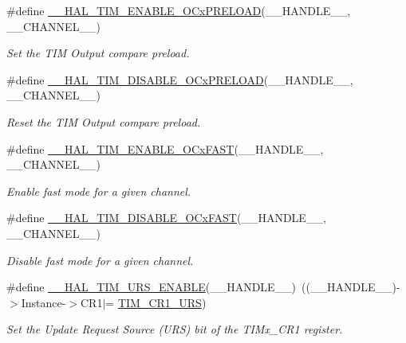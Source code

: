 \begin{DoxyCompactItemize}
\#define \hyperlink{group___t_i_m___exported___macros_ga199e848f0a301987a500faea0db2dd70}{\+\_\+\+\_\+\+H\+A\+L\+\_\+\+T\+I\+M\+\_\+\+E\+N\+A\+B\+L\+E\+\_\+\+O\+Cx\+P\+R\+E\+L\+O\+AD}(\+\_\+\+\_\+\+H\+A\+N\+D\+L\+E\+\_\+\+\_\+,  \+\_\+\+\_\+\+C\+H\+A\+N\+N\+E\+L\+\_\+\+\_\+)
\begin{DoxyCompactList}\small\item\em Set the T\+IM Output compare preload. \end{DoxyCompactList}\item 
\#define \hyperlink{group___t_i_m___exported___macros_ga3e0ec4eb797b54c408a3be067f41a2f8}{\+\_\+\+\_\+\+H\+A\+L\+\_\+\+T\+I\+M\+\_\+\+D\+I\+S\+A\+B\+L\+E\+\_\+\+O\+Cx\+P\+R\+E\+L\+O\+AD}(\+\_\+\+\_\+\+H\+A\+N\+D\+L\+E\+\_\+\+\_\+,  \+\_\+\+\_\+\+C\+H\+A\+N\+N\+E\+L\+\_\+\+\_\+)
\begin{DoxyCompactList}\small\item\em Reset the T\+IM Output compare preload. \end{DoxyCompactList}\item 
\#define \hyperlink{group___t_i_m___exported___macros_ga390795eb198214e5d4ed235ae3f751e4}{\+\_\+\+\_\+\+H\+A\+L\+\_\+\+T\+I\+M\+\_\+\+E\+N\+A\+B\+L\+E\+\_\+\+O\+Cx\+F\+A\+ST}(\+\_\+\+\_\+\+H\+A\+N\+D\+L\+E\+\_\+\+\_\+,  \+\_\+\+\_\+\+C\+H\+A\+N\+N\+E\+L\+\_\+\+\_\+)
\begin{DoxyCompactList}\small\item\em Enable fast mode for a given channel. \end{DoxyCompactList}\item 
\#define \hyperlink{group___t_i_m___exported___macros_gab9f8dc78886759192b5f044c7b9b0aa7}{\+\_\+\+\_\+\+H\+A\+L\+\_\+\+T\+I\+M\+\_\+\+D\+I\+S\+A\+B\+L\+E\+\_\+\+O\+Cx\+F\+A\+ST}(\+\_\+\+\_\+\+H\+A\+N\+D\+L\+E\+\_\+\+\_\+,  \+\_\+\+\_\+\+C\+H\+A\+N\+N\+E\+L\+\_\+\+\_\+)
\begin{DoxyCompactList}\small\item\em Disable fast mode for a given channel. \end{DoxyCompactList}\item 
\#define \hyperlink{group___t_i_m___exported___macros_ga3b06856bd6d7e10cfff342b1726db51d}{\+\_\+\+\_\+\+H\+A\+L\+\_\+\+T\+I\+M\+\_\+\+U\+R\+S\+\_\+\+E\+N\+A\+B\+LE}(\+\_\+\+\_\+\+H\+A\+N\+D\+L\+E\+\_\+\+\_\+)~((\+\_\+\+\_\+\+H\+A\+N\+D\+L\+E\+\_\+\+\_\+)-\/$>$Instance-\/$>$C\+R1$\vert$= \hyperlink{group___peripheral___registers___bits___definition_ga06c997c2c23e8bef7ca07579762c113b}{T\+I\+M\+\_\+\+C\+R1\+\_\+\+U\+RS})
\begin{DoxyCompactList}\small\item\em Set the Update Request Source (U\+RS) bit of the T\+I\+Mx\+\_\+\+C\+R1 register. \end{DoxyCompactList}\item 

\end{DoxyCompactItemize}
